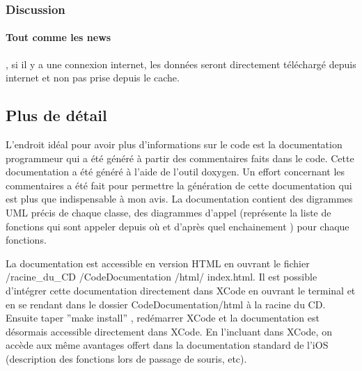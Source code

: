 					\subsubsection*{Discussion}
					\paragraph{Tout comme les news}, si il y a une connexion internet, les données seront directement téléchargé depuis internet et non pas prise depuis le cache.

	\subsection{Plus de détail}
		L'endroit idéal pour avoir plus d'informations sur le code est la documentation programmeur qui a été généré à partir des commentaires faits dans le code. Cette documentation a été généré à l'aide de l'outil doxygen. Un effort concernant les commentaires a été fait pour permettre la génération de cette documentation qui est plus que indispensable à mon avis. La documentation contient des digrammes UML précis de chaque classe, des diagrammes d'appel (représente la liste de fonctions qui sont appeler depuis où et d'après quel enchainement )  pour chaque fonctions.
		
		La documentation est accessible en version HTML en ouvrant le fichier /racine\_du\_CD /CodeDocumentation /html/ index.html.
		Il est possible d'intégrer cette documentation directement dans XCode en ouvrant le terminal et en se rendant dans le dossier CodeDocumentation/html à la racine du CD. Ensuite taper ''make install'' , redémarrer XCode et la documentation est désormais accessible directement dans XCode. En l'incluant dans XCode, on accède aux même avantages offert dans la documentation standard de l'iOS (description des fonctions lors de passage de souris, etc). 


		  
